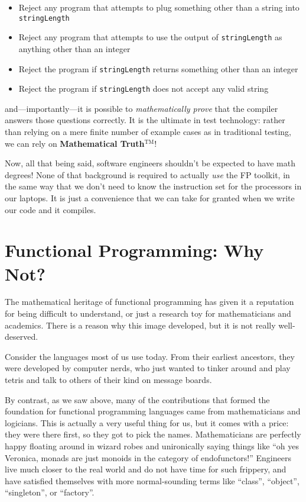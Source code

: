 \documentclass{book}
\newcommand{\mlil}[1]{\lstinline[language=pseudoml,columns=fixed]|#1|}\usepackage{caption}
\begin{document}
\begin{itemize}
    \item Reject any program that attempts to plug something other than a string into \mlil{stringLength}
    \item Reject any program that attempts to use the output of \mlil{stringLength} as anything other than an integer
    \item Reject the program if \mlil{stringLength} returns something other than an integer
    \item Reject the program if \mlil{stringLength} does not accept any valid string
\end{itemize}

\noindent and---importantly---it is possible to \emph{mathematically prove} that the compiler answers those questions correctly. It is the ultimate in test technology: rather than relying on a mere finite number of example cases as in traditional testing, we can rely on \textbf{Mathematical Truth}\( ^{\text{TM}} \)!

Now, all that being said, software engineers shouldn't be expected to have math degrees! None of that background is required to actually \emph{use} the FP toolkit, in the same way that we don't need to know the instruction set for the processors in our laptops. It is just a convenience that we can take for granted when we write our code and it compiles.

\section{Functional Programming: Why Not?}

The mathematical heritage of functional programming has given it a reputation for being difficult to understand, or just a research toy for mathematicians and academics. There is a reason why this image developed, but it is not really well-deserved.

Consider the languages most of us use today. From their earliest ancestors, they were developed by computer nerds, who just wanted to tinker around and play tetris and talk to others of their kind on message boards.

By contrast, as we saw above, many of the contributions that formed the foundation for functional programming languages came from mathematicians and logicians. This is actually a very useful thing for us, but it comes with a price: they were there first, so they got to pick the names. Mathematicians are perfectly happy floating around in wizard robes and unironically saying things like ``oh yes Veronica, monads are just monoids in the category of endofunctors!'' Engineers live much closer to the real world and do not have time for such frippery, and have satisfied themselves with more normal-sounding terms like ``class'', ``object'', ``singleton'', or ``factory''.
\end{document}
